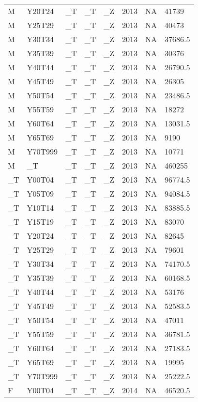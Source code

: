 \begin{longtable}[t]{llllllll}
M & Y20T24 & \_T & \_T & \_Z & 2013 & NA & 41739\\
M & Y25T29 & \_T & \_T & \_Z & 2013 & NA & 40473\\
M & Y30T34 & \_T & \_T & \_Z & 2013 & NA & 37686.5\\
M & Y35T39 & \_T & \_T & \_Z & 2013 & NA & 30376\\
\addlinespace
M & Y40T44 & \_T & \_T & \_Z & 2013 & NA & 26790.5\\
M & Y45T49 & \_T & \_T & \_Z & 2013 & NA & 26305\\
M & Y50T54 & \_T & \_T & \_Z & 2013 & NA & 23486.5\\
M & Y55T59 & \_T & \_T & \_Z & 2013 & NA & 18272\\
M & Y60T64 & \_T & \_T & \_Z & 2013 & NA & 13031.5\\
\addlinespace
M & Y65T69 & \_T & \_T & \_Z & 2013 & NA & 9190\\
M & Y70T999 & \_T & \_T & \_Z & 2013 & NA & 10771\\
M & \_T & \_T & \_T & \_Z & 2013 & NA & 460255\\
\_T & Y00T04 & \_T & \_T & \_Z & 2013 & NA & 96774.5\\
\_T & Y05T09 & \_T & \_T & \_Z & 2013 & NA & 94084.5\\
\addlinespace
\_T & Y10T14 & \_T & \_T & \_Z & 2013 & NA & 83885.5\\
\_T & Y15T19 & \_T & \_T & \_Z & 2013 & NA & 83070\\
\_T & Y20T24 & \_T & \_T & \_Z & 2013 & NA & 82645\\
\_T & Y25T29 & \_T & \_T & \_Z & 2013 & NA & 79601\\
\_T & Y30T34 & \_T & \_T & \_Z & 2013 & NA & 74170.5\\
\addlinespace
\_T & Y35T39 & \_T & \_T & \_Z & 2013 & NA & 60168.5\\
\_T & Y40T44 & \_T & \_T & \_Z & 2013 & NA & 53176\\
\_T & Y45T49 & \_T & \_T & \_Z & 2013 & NA & 52583.5\\
\_T & Y50T54 & \_T & \_T & \_Z & 2013 & NA & 47011\\
\_T & Y55T59 & \_T & \_T & \_Z & 2013 & NA & 36781.5\\
\addlinespace
\_T & Y60T64 & \_T & \_T & \_Z & 2013 & NA & 27183.5\\
\_T & Y65T69 & \_T & \_T & \_Z & 2013 & NA & 19995\\
\_T & Y70T999 & \_T & \_T & \_Z & 2013 & NA & 25222.5\\
F & Y00T04 & \_T & \_T & \_Z & 2014 & NA & 46520.5\\

\end{longtable}
